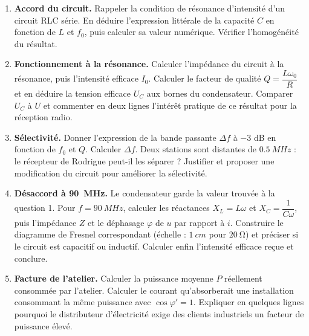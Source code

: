 \documentclass[11pt]{article}
\newcounter{popsec}
\newcounter{popsub}
\newcommand{\courssub}[1]{%
  \stepcounter{popsub}%
  \par\vspace{9pt}\noindent{\popxbold\fontsize{11.5}{13}\selectfont\color{popink}{\color{poporange}\thepopsec.\thepopsub}\hspace{6pt}#1}\par\nopagebreak\vspace{4pt}
}
\begin{document}
\begin{enumerate}
\item \textbf{Accord du circuit.} Rappeler la condition de résonance d'intensité d'un circuit RLC série. En déduire l'expression littérale de la capacité $C$ en fonction de $L$ et $f_0$, puis calculer sa valeur numérique. Vérifier l'homogénéité du résultat.
\item \textbf{Fonctionnement à la résonance.} Calculer l'impédance du circuit à la résonance, puis l'intensité efficace $I_0$. Calculer le facteur de qualité $Q = \dfrac{L\omega_0}{R}$ et en déduire la tension efficace $U_C$ aux bornes du condensateur. Comparer $U_C$ à $U$ et commenter en deux lignes l'intérêt pratique de ce résultat pour la réception radio.
\item \textbf{Sélectivité.} Donner l'expression de la bande passante $\Delta f$ à $-3$ dB en fonction de $f_0$ et $Q$. Calculer $\Delta f$. Deux stations sont distantes de $\SI{0,5}{MHz}$ : le récepteur de Rodrigue peut-il les séparer ? Justifier et proposer une modification du circuit pour améliorer la sélectivité.
\item \textbf{Désaccord à \SI{90}{MHz}.} Le condensateur garde la valeur trouvée à la question 1. Pour $f = \SI{90}{MHz}$, calculer les réactances $X_L = L\omega$ et $X_C = \dfrac{1}{C\omega}$, puis l'impédance $Z$ et le déphasage $\varphi$ de $u$ par rapport à $i$. Construire le diagramme de Fresnel correspondant (échelle : $\SI{1}{cm}$ pour $\SI{20}{\ohm}$) et préciser si le circuit est capacitif ou inductif. Calculer enfin l'intensité efficace reçue et conclure.
\item \textbf{Facture de l'atelier.} Calculer la puissance moyenne $P$ réellement consommée par l'atelier. Calculer le courant qu'absorberait une installation consommant la même puissance avec $\cos\varphi' = 1$. Expliquer en quelques lignes pourquoi le distributeur d'électricité exige des clients industriels un facteur de puissance élevé.
\end{enumerate}

\courssub{Ressources à mobiliser}
\end{document}
